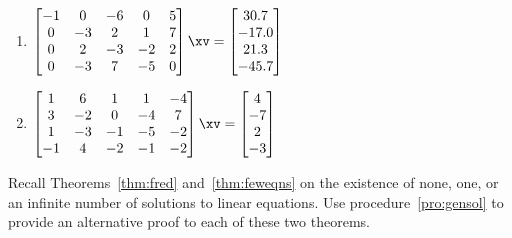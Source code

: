 \begin{exercise}
\begin{enumerate}
\item \(\begin{bmatrix} -1&0&-6&0&5
\\0&-3&2&1&7
\\0&2&-3&-2&2
\\0&-3&7&-5&0 \end{bmatrix}\xv
=\begin{bmatrix} 30.7
\\-17.0
\\21.3
\\-45.7 \end{bmatrix}\)
\setbox\ajrqrbox\hbox{}%
\marginpar{\usebox{\ajrqrbox\\[2ex]}}%


\item \(\begin{bmatrix} 1&6&1&1&-4
\\3&-2&0&-4&7
\\1&-3&-1&-5&-2
\\-1&4&-2&-1&-2 \end{bmatrix}\xv
=\begin{bmatrix} 4
\\-7
\\2
\\-3 \end{bmatrix}\)
\setbox\ajrqrbox\hbox{}%
\marginpar{\usebox{\ajrqrbox\\[2ex]}}%


%
%
\end{enumerate}
\end{exercise}




\begin{exercise} \label{ex:} 
Recall Theorems~\ref{thm:fred} and~\ref{thm:feweqns} on the existence of none, one, or an infinite number of solutions to linear equations.
Use procedure~\ref{pro:gensol} to provide an alternative proof to each of these two theorems.
\end{exercise}





